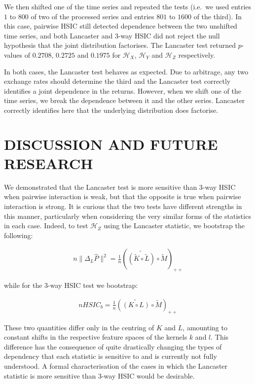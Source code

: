 \documentclass[]{article}
\begin{document}
We then shifted one of the time series and repeated the tests (i.e.~we used entries $1$ to $800$ of two of the processed series and entries $801$ to $1600$ of the third). In this case, pairwise HSIC still detected dependence between the two unshifted time series, and both Lancaster and 3-way HSIC did not reject the null hypothesis that the joint distribution factorises. The Lancaster test returned $p$-values of $0.2708$, $0.2725$ and $0.1975$ for $\mathcal{H}_X$, $\mathcal{H}_Y$ and $\mathcal{H}_Z$ respectively.

In both cases, the Lancaster test behaves as expected. Due to arbitrage, any two exchange rates should determine the third and the Lancaster test correctly identifies a joint dependence in the returns. However, when we shift one of the time series, we break the dependence between it and the other series. Lancaster correctly identifies here that the underlying distribution does factorise.

\section{DISCUSSION AND FUTURE RESEARCH}\label{section:discussion}

We demonstrated that the Lancaster test is more sensitive than 3-way HSIC when pairwise interaction is weak, but that the opposite is true when pairwise interaction is strong. It is curious that the two tests have different strengths in this manner, particularly when considering the very similar forms of the statistics in each case. Indeed, to test $\mathcal{H}_Z$ using the Lancaster statistic, we bootstrap the following:

\begin{align*}
n\|\Delta_L\hat{P}\|^2 = \frac{1}{n}\left(\widetilde{\left( \tilde{K} \circ \tilde{L}\right) }\circ \tilde{M} \right)_{++}
\end{align*}

while for the 3-way HSIC test we bootstrap:

\begin{align*}
nHSIC_b = \frac{1}{n}\left(\widetilde{\left( K \circ L\right) }\circ \tilde{M} \right)_{++}
\end{align*}

These two quantities differ only in the centring of $K$ and $L$, amounting to constant shifts in the respective feature spaces of the kernels $k$ and $l$. This difference has the consequence of quite drastically changing the types of dependency that each statistic is sensitive to and is currently not fully understood. A formal characterisation of the cases in which the Lancaster statistic is more sensitive than 3-way HSIC would be desirable.
\end{document}

